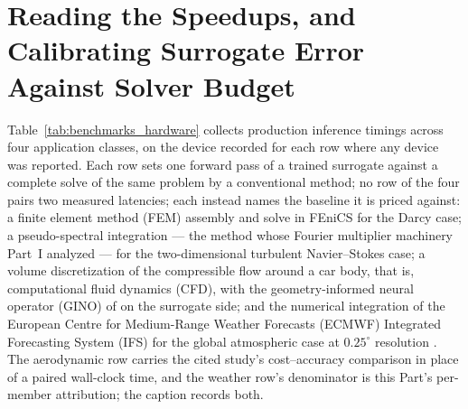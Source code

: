 \section{Reading the Speedups, and Calibrating Surrogate Error Against Solver Budget}
\label{sec:ch27-calibration}

Table~\ref{tab:benchmarks_hardware} collects production inference timings across
four application classes, on the device recorded for each row where any device was
reported. Each row
sets one forward pass of a trained surrogate against a complete solve of the same
problem by a conventional method; no row of the four pairs two measured
latencies; each instead names the baseline it is priced against: a finite element method (FEM) assembly and solve
in FEniCS for the Darcy case; a pseudo-spectral integration --- the method
whose Fourier multiplier machinery Part~I analyzed --- for the two-dimensional
turbulent Navier--Stokes case; a
volume discretization of the compressible flow around a car
body, that is, computational fluid dynamics (CFD), with the
geometry-informed neural operator (GINO)
of  on the surrogate side;
and the numerical integration of the European Centre for Medium-Range Weather
Forecasts (ECMWF) Integrated Forecasting System (IFS) for the global
atmospheric case at $0.25^{\circ}$ resolution \cite{pathak2022fourcastnet}. The aerodynamic row carries the cited study's
cost--accuracy comparison in place of a paired wall-clock time, and the weather row's
denominator is this Part's per-member attribution; the caption records both.

